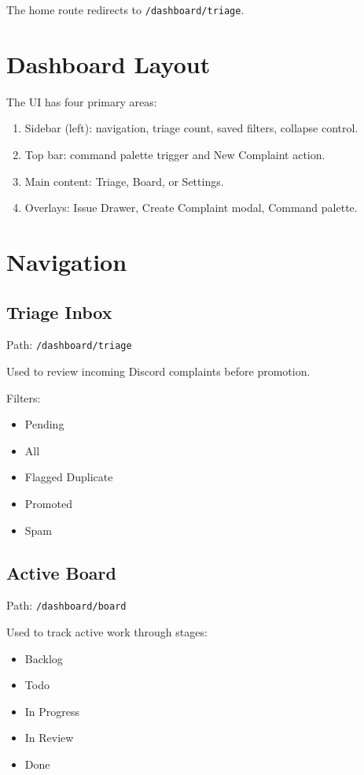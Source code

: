 \documentclass[11pt,a4paper]{article}
\begin{document}
The home route redirects to \texttt{/dashboard/triage}.

\section{Dashboard Layout}
The UI has four primary areas:
\begin{enumerate}
  \item Sidebar (left): navigation, triage count, saved filters, collapse control.
  \item Top bar: command palette trigger and New Complaint action.
  \item Main content: Triage, Board, or Settings.
  \item Overlays: Issue Drawer, Create Complaint modal, Command palette.
\end{enumerate}

\section{Navigation}
\subsection{Triage Inbox}
Path: \texttt{/dashboard/triage}

Used to review incoming Discord complaints before promotion.

Filters:
\begin{itemize}
  \item Pending
  \item All
  \item Flagged Duplicate
  \item Promoted
  \item Spam
\end{itemize}

\subsection{Active Board}
Path: \texttt{/dashboard/board}

Used to track active work through stages:
\begin{itemize}
  \item Backlog
  \item Todo
  \item In Progress
  \item In Review
  \item Done
\end{itemize}
\end{document}
